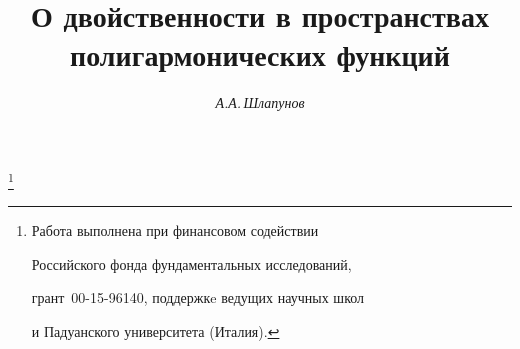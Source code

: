 




%





\newcommand{\sol}{\operatorname{sol}}


\newcommand{\tts}[1]{}







\setcounter{page}{79}















\author{\it А.А.\,Шлапунов}




\title{О двойственности в пространствах\\ полигармонических функций}


\thanks{Работа выполнена при финансовом содействии


Российского фонда фундаментальных исследований,


грант \No\,00-15-96140, поддержкe ведущих научных школ


и Падуанского университета (Италия).}





\date{}




\pagestyle{plain} %







